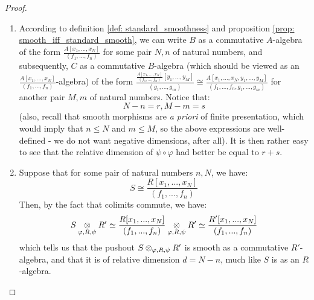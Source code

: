                 \begin{proof}
                    \noindent
                    \begin{enumerate}
                        \item According to definition \ref{def: standard_smoothness} and proposition \ref{prop: smooth_iff_standard_smooth}, we can write $B$ as a commutative $A$-algebra of the form $\frac{A[x_1, ..., x_N]}{(f_1, ..., f_n)}$ for some pair $N, n$ of natural numbers, and subsequently, $C$ as a commutative $B$-algebra (which should be viewed as an $\frac{A[x_1, ..., x_N]}{(f_1, ..., f_n)}$-algebra) of the form $\frac{\frac{A[x_1, ..., x_N]}{(f_1, ..., f_n)}[y_1, ..., y_M]}{(g_1, ..., g_m)} \cong \frac{A[x_1, ..., x_N, y_1, ..., y_M]}{(f_1, ..., f_n, g_1, ..., g_m)}$ for another pair $M, m$ of natural numbers. Notice that:
                            $$N - n = r, M - m = s$$
                        (also, recall that smooth morphisms are \textit{a priori} of finite presentation, which would imply that $n \leq N$ and $m \leq M$, so the above expressions are well-defined - we do not want negative dimensions, after all). It is then rather easy to see that the relative dimension of $\psi \circ \varphi$ had better be equal to $r + s$.
                        \item Suppose that for some pair of natural numbers $n, N$, we have:
                            $$S \cong \frac{R[x_1, ..., x_N]}{(f_1, ..., f_n)}$$
                        Then, by the fact that colimits commute, we have:
                            $$S \tensor_{\varphi, R, \psi} R' \cong \frac{R[x_1, ..., x_N]}{(f_1, ..., f_n)} \tensor_{\varphi, R, \psi} R' \cong \frac{R'[x_1, ..., x_N]}{(f_1, ..., f_n)}$$
                        which tells us that the pushout $S \tensor_{\varphi, R, \psi} R'$ is smooth as a commutative $R'$-algebra, and that it is of relative dimension $d = N - n$, much like $S$ is as an $R$-algebra.
                    \end{enumerate}
                \end{proof}
